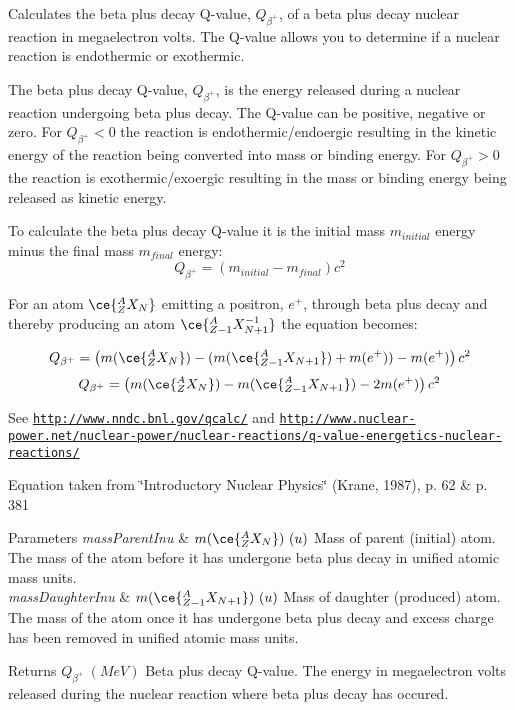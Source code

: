 Calculates the beta plus decay Q-\/value, $Q_{\beta^+}$, of a beta plus decay nuclear reaction in megaelectron volts. The Q-\/value allows you to determine if a nuclear reaction is endothermic or exothermic. 

The beta plus decay Q-\/value, $Q_{\beta^+}$, is the energy released during a nuclear reaction undergoing beta plus decay. The Q-\/value can be positive, negative or zero. For $Q_{\beta^+} < 0$ the reaction is endothermic/endoergic resulting in the kinetic energy of the reaction being converted into mass or binding energy. For $Q_{\beta^+} > 0$ the reaction is exothermic/exoergic resulting in the mass or binding energy being released as kinetic energy.

To calculate the beta plus decay Q-\/value it is the initial mass $m_{initial}$ energy minus the final mass $m_{final}$ energy\+: \[Q_{\beta^+} = \left ( m_{initial}-m_{final}\right ) c^2\]

For an atom $\ce{ ^{A}_{Z}X_{N} }$ emitting a positron, $e^+$, through beta plus decay and thereby producing an atom $\ce{ ^{A}_{Z{-1}}X^{-1}_{N{+1}} }$ the equation becomes\+:

\[Q_{\beta^+} = \left ( m(\ce{ ^{A}_{Z}X_{N} }) - (m(\ce{ ^{A}_{Z{-1}}X_{N{+1}} }) + m(e^+)) - m(e^+)\right ) c^2\] \[Q_{\beta^+} = \left ( m(\ce{ ^{A}_{Z}X_{N} }) - m(\ce{ ^{A}_{Z{-1}}X_{N{+1}} }) - 2m(e^+)\right ) c^2\]

See \href{http://www.nndc.bnl.gov/qcalc/}{\tt http\+://www.\+nndc.\+bnl.\+gov/qcalc/} and \href{http://www.nuclear-power.net/nuclear-power/nuclear-reactions/q-value-energetics-nuclear-reactions/}{\tt http\+://www.\+nuclear-\/power.\+net/nuclear-\/power/nuclear-\/reactions/q-\/value-\/energetics-\/nuclear-\/reactions/}

Equation taken from \char`\"{}\+Introductory Nuclear Physics\char`\"{} (Krane, 1987), p. 62 \& p. 381


\begin{DoxyParams}{Parameters}
{\em mass\+Parent\+Inu} & $m(\ce{ ^{A}_{Z}X_{N} })\ (u)$ Mass of parent (initial) atom. The mass of the atom before it has undergone beta plus decay in unified atomic mass units. \\
\hline
{\em mass\+Daughter\+Inu} & $m(\ce{ ^{A}_{Z{-1}}X_{N{+1}} })\ (u)$ Mass of daughter (produced) atom. The mass of the atom once it has undergone beta plus decay and excess charge has been removed in unified atomic mass units. \\
\hline
\end{DoxyParams}
\begin{DoxyReturn}{Returns}
$Q_{\beta^+}\ (MeV)$ Beta plus decay Q-\/value. The energy in megaelectron volts released during the nuclear reaction where beta plus decay has occured. 
\end{DoxyReturn}
\mbox{\label{group___q_value_gaefd0ecd4ae3166d18a4748ff540e6bfc}} 
